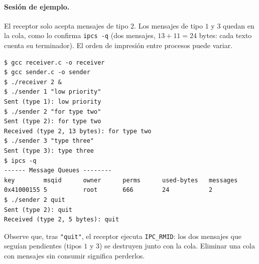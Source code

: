 \documentclass[12pt,a4paper]{article}
\begin{document}
\paragraph{Sesión de ejemplo.} El receptor solo acepta mensajes de tipo $2$. Los mensajes de tipo $1$ y $3$ quedan en la cola, como lo confirma \texttt{ipcs -q} (dos mensajes, $13 + 11 = 24$ bytes: cada texto cuenta su terminador). El orden de impresión entre procesos puede variar.

\begin{lstlisting}[language={}, numbers=none]
$ gcc receiver.c -o receiver
$ gcc sender.c -o sender
$ ./receiver 2 &
$ ./sender 1 "low priority"
Sent (type 1): low priority
$ ./sender 2 "for type two"
Sent (type 2): for type two
Received (type 2, 13 bytes): for type two
$ ./sender 3 "type three"
Sent (type 3): type three
$ ipcs -q
------ Message Queues --------
key        msqid      owner      perms      used-bytes   messages
0x41000155 5          root       666        24           2
$ ./sender 2 quit
Sent (type 2): quit
Received (type 2, 5 bytes): quit
\end{lstlisting}

Observe que, tras \texttt{"quit"}, el receptor ejecuta \texttt{IPC\_RMID}: los dos mensajes que seguían pendientes (tipos $1$ y $3$) se destruyen junto con la cola. Eliminar una cola con mensajes sin consumir significa perderlos.

\newpage
\end{document}
